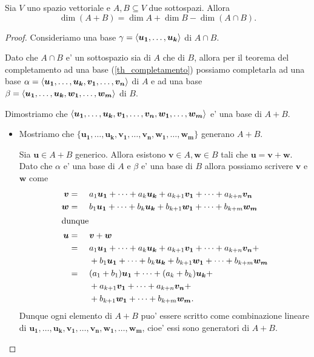 \begin{theorem}
    [di Grassman] \label{th_grassman}
    Sia $V$ uno spazio vettoriale e $A, B \subseteq V$ due sottospazi. Allora \begin{equation}
        \dim(A + B) = \dim A + \dim B - \dim(A \cap B).
    \end{equation}
\end{theorem}
\begin{proof}
    Consideriamo una base $\gamma = \left\langle \bm{u_1}, \dots, \bm{u_k} \right\rangle$ di $A \cap B$.

    Dato che $A \cap B$ e' un sottospazio sia di $A$ che di $B$, allora per il teorema del completamento ad una base (\ref{th_completamento}) possiamo completarla ad una base $\alpha = \left\langle \bm{u_1}, \dots, \bm{u_k}, \bm{v_1}, \dots, \bm{v_n} \right\rangle$ di $A$ e ad una base $\beta = \left\langle \bm{u_1}, \dots, \bm{u_k}, \bm{w_1}, \dots, \bm{w_m} \right\rangle$ di $B$.

    Dimostriamo che $\left\langle \bm{u_1}, \dots, \bm{u_k}, \bm{v_1}, \dots, \bm{v_n}, \bm{w_1}, \dots, \bm{w_m} \right\rangle$ e' una base di $A + B$.

    \begin{itemize}
        \item Mostriamo che $\{\bm{u_1}, \dots, \bm{u_k}, \bm{v_1}, \dots, \bm{v_n}, \bm{w_1}, \dots, \bm{w_m}\}$ generano $A + B$.
        
        Sia $\bm u \in A + B$ generico. Allora esistono $\bm v \in A, \bm w \in B$ tali che $\bm{u} = \bm{v} + \bm{w}$. Dato che $\alpha$ e' una base di $A$ e $\beta$ e' una base di $B$ allora possiamo scrivere $\bm v$ e $\bm w$ come \begin{alignat*}{2}
            \bm{v} &=\ && a_1\bm{u_1} + \dots + a_k\bm{u_k} + a_{k+1}\bm{v_1} + \dots + a_{k+n}\bm{v_n} \\
            \bm{w} &=\ && b_1\bm{u_1} + \dots + b_k\bm{u_k} + b_{k+1}\bm{w_1} + \dots + b_{k+m}\bm{w_m} \\
            \intertext{dunque}
            \bm{u} &=\ && \bm{v} + \bm{w}\\
                &=\ && a_1\bm{u_1} + \dots + a_k\bm{u_k} + a_{k+1}\bm{v_1} + \dots + a_{k+n}\bm{v_n} + \\
                & && + b_1\bm{u_1} + \dots + b_k\bm{u_k} + b_{k+1}\bm{w_1} + \dots + b_{k+m}\bm{w_m} \\
                &=\ && (a_1 + b_1)\bm{u_1} + \dots + (a_k + b_k)\bm{u_k} + \\
                & && + a_{k+1}\bm{v_1} + \dots + a_{k+n}\bm{v_n} + \\
                & && + b_{k+1}\bm{w_1} + \dots + b_{k+m}\bm{w_m}.
        \end{alignat*}
        Dunque ogni elemento di $A + B$ puo' essere scritto come combinazione lineare di $\bm{u_1}, \dots, \bm{u_k}, \bm{v_1}, \dots, \bm{v_n}, \bm{w_1}, \dots, \bm{w_m}$, cioe' essi sono generatori di $A + B$.


\end{itemize}
\end{proof}
